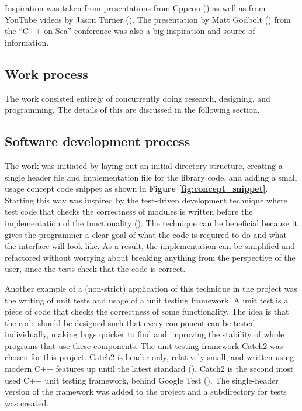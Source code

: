 \documentclass[12pt, a4paper]{article}
\begin{document}
Inspiration was taken from presentations from Cppcon (\cite{CppCon}) as well as from YouTube videos by Jason Turner (\cite{JasonTurnerChannel}). The presentation  by Matt Godbolt (\cite{MattGodboltCorrectByConstruction}) from the “C++ on Sea” conference was also a big inspiration and source of information.

\subsection{Work process}
The work consisted entirely of concurrently doing research, designing, and programming. The details of this are discussed in the following section.

\subsection{Software development process}
The work was initiated by laying out an initial directory structure, creating a single header file and implementation file for the library code, and adding a small usage concept code snippet as shown in \textbf{Figure \ref{fig:concept_snippet}}. Starting this way was inspired by the test-driven development technique where test code that checks the correctness of modules is written before the implementation of the functionality (\cite{TestDrivenDevelopment}). The technique can be beneficial because it gives the programmer a clear goal of what the code is required to do and what the interface will look like. As a result, the implementation can be simplified and refactored without worrying about breaking anything from the perspective of the user, since the tests check that the code is correct. 

Another example of a (non-strict) application of this technique in the project was the writing of unit tests and usage of a unit testing framework. A unit test is a piece of code that checks the correctness of some functionality. The idea is that the code should be designed such that every component can be tested individually, making bugs quicker to find and improving the stability of whole programs that use these components. The unit testing framework Catch2 was chosen for this project. Catch2 is header-only, relatively small, and written using modern C++ features up until the latest standard (\cite{Catch2}). Catch2 is the second most used C++ unit testing framework, behind Google Test (\cite{DeveloperStatistics}). The single-header version of the framework was added to the project and a subdirectory for tests was created. 
\end{document}
